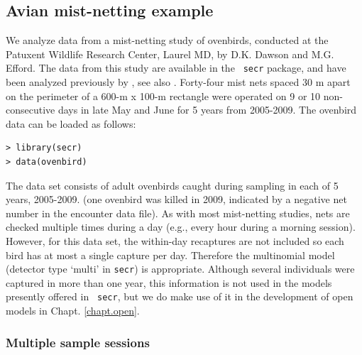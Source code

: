\subsection{Avian mist-netting example}
\label{poisson-mn.sec.ovenbird}

We analyze data from a mist-netting study of ovenbirds, conducted at
the Patuxent Wildlife Research Center, Laurel MD, by D.K. Dawson and
M.G.  Efford. The data from this study are available in the \mbox{\tt
  secr} package, and have been analyzed previously by
\citet{efford_etal:2004}, see also \citet{borchers_efford:2008}.
Forty-four mist nets spaced 30 m apart on the perimeter of a 600-m x
100-m rectangle were operated on 9 or 10 non-consecutive days in late
May and June for 5 years from 2005-2009.
The ovenbird
data can be loaded as follows:
\begin{verbatim}
> library(secr)
> data(ovenbird)
\end{verbatim}
The data set consists of adult ovenbirds caught during sampling in each
of 5 years, 2005-2009. (one ovenbird was killed in 2009, indicated by
a negative net number in the encounter data file).
As with most mist-netting studies, nets are checked multiple times
during a day (e.g., every hour during a morning session). However, for
this data set, the within-day recaptures are not included so each bird
has at most a single capture per day. Therefore the multinomial model
(detector type `multi' in \mbox{\tt secr}) is appropriate.
 Although
several individuals were captured in more than one year, this
information is not used in the models presently offered in \mbox{\tt
  secr}, but we do make use of it in the development of open models in
Chapt. \ref{chapt.open}.


\subsubsection{Multiple sample sessions}

